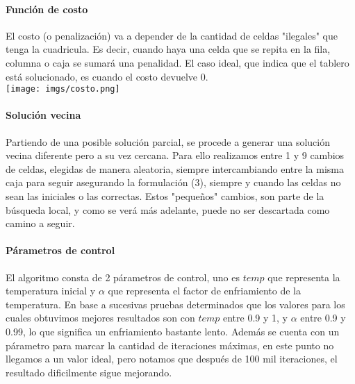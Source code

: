 \paragraph{Función de costo}
El costo (o penalización) va a depender de la cantidad de celdas "ilegales" que tenga la cuadricula. Es decir, cuando haya una celda que se repita en la fila, columna o caja se sumará una penalidad. El caso ideal, que indica que el tablero está solucionado, es cuando el costo devuelve 0.\\
\texttt{[image: imgs/costo.png]}	
\paragraph{Solución vecina}
Partiendo de una posible solución parcial, se procede a generar una solución vecina diferente pero a su vez cercana. Para ello realizamos entre 1 y 9 cambios de celdas, elegidas de manera aleatoria, siempre intercambiando entre la misma caja para seguir asegurando la formulación (3), siempre y cuando las celdas no sean las iniciales o las correctas. Estos "pequeños" cambios, son parte de la búsqueda local, y como se verá más adelante, puede no ser descartada como camino a seguir.
\paragraph{Párametros de control}
El algoritmo consta de 2 párametros de control, uno es $temp$ que representa la temperatura inicial y $\alpha$ que representa el factor de enfriamiento de la temperatura. En base a sucesivas pruebas determinados que los valores para los cuales obtuvimos mejores resultados son con $temp$ entre 0.9 y 1, y $\alpha$ entre 0.9 y 0.99, lo que significa un enfriamiento bastante lento.
Además se cuenta con un párametro para marcar la cantidad de iteraciones máximas, en este punto no llegamos a un valor ideal, pero notamos que después de 100 mil iteraciones, el resultado dificilmente sigue mejorando.
